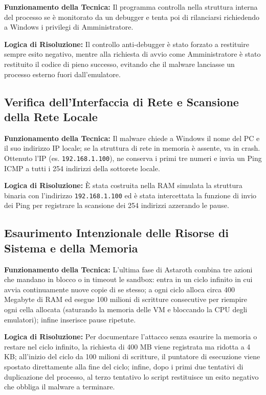 \documentclass[11pt, a4paper]{article}
\begin{document}
	\textbf{Funzionamento della Tecnica:} Il programma controlla nella struttura interna del processo se è monitorato da un debugger e tenta poi di rilanciarsi richiedendo a Windows i privilegi di Amministratore.
	
	\textbf{Logica di Risoluzione:} Il controllo anti-debugger è stato forzato a restituire sempre esito negativo, mentre alla richiesta di avvio come Amministratore è stato restituito il codice di pieno successo, evitando che il malware lanciasse un processo esterno fuori dall'emulatore.
	
	\subsection{Verifica dell'Interfaccia di Rete e Scansione della Rete Locale}
	
	\textbf{Funzionamento della Tecnica:} Il malware chiede a Windows il nome del PC e il suo indirizzo IP locale; se la struttura di rete in memoria è assente, va in crash. Ottenuto l'IP (es. \texttt{192.168.1.100}), ne conserva i primi tre numeri e invia un Ping ICMP a tutti i 254 indirizzi della sottorete locale.
	
	\textbf{Logica di Risoluzione:} È stata costruita nella RAM simulata la struttura binaria con l'indirizzo \texttt{192.168.1.100} ed è stata intercettata la funzione di invio dei Ping per registrare la scansione dei 254 indirizzi azzerando le pause.
	
	\subsection{Esaurimento Intenzionale delle Risorse di Sistema e della Memoria}
	
	\textbf{Funzionamento della Tecnica:} L'ultima fase di Astaroth combina tre azioni che mandano in blocco o in timeout le sandbox: entra in un ciclo infinito in cui avvia continuamente nuove copie di se stesso; a ogni ciclo alloca circa 400 Megabyte di RAM ed esegue 100 milioni di scritture consecutive per riempire ogni cella allocata (saturando la memoria delle VM e bloccando la CPU degli emulatori); infine inserisce pause ripetute.
	
	\textbf{Logica di Risoluzione:} Per documentare l'attacco senza esaurire la memoria o restare nel ciclo infinito, la richiesta di 400 MB viene registrata ma ridotta a 4 KB; all'inizio del ciclo da 100 milioni di scritture, il puntatore di esecuzione viene spostato direttamente alla fine del ciclo; infine, dopo i primi due tentativi di duplicazione del processo, al terzo tentativo lo script restituisce un esito negativo che obbliga il malware a terminare.
	
\end{document}
